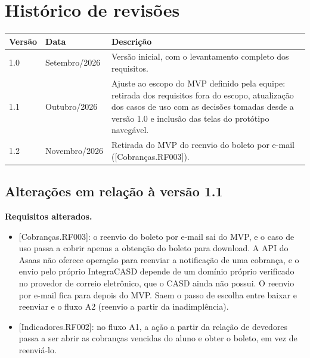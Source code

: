\documentclass[11pt,a4paper,oneside]{report}
\begin{document}

\chapter*{Histórico de revisões}

\begin{tabularx}{\linewidth}{@{}l l X@{}}
  \toprule
  \textbf{Versão} & \textbf{Data} & \textbf{Descrição} \\
  \midrule
  1.0 & Setembro/2026 & Versão inicial, com o levantamento completo dos requisitos. \\
  1.1 & Outubro/2026  & Ajuste ao escopo do MVP definido pela equipe: retirada dos requisitos
                        fora do escopo, atualização dos casos de uso com as decisões tomadas desde
                        a versão 1.0 e inclusão das telas do protótipo navegável. \\
  1.2 & Novembro/2026 & Retirada do MVP do reenvio do boleto por e-mail ([Cobranças.RF003]). \\
  \bottomrule
\end{tabularx}

\section*{Alterações em relação à versão 1.1}

\textbf{Requisitos alterados.}
\begin{itemize}
  \item {[Cobranças.RF003]}: o reenvio do boleto por e-mail sai do MVP, e o caso de uso passa a
        cobrir apenas a obtenção do boleto para download. A API do Asaas não oferece operação para
        reenviar a notificação de uma cobrança, e o envio pelo próprio IntegraCASD depende de um
        domínio próprio verificado no provedor de correio eletrônico, que o CASD ainda não possui.
        O reenvio por e-mail fica para depois do MVP. Saem o passo de escolha entre baixar e
        reenviar e o fluxo A2 (reenvio a partir da inadimplência).
  \item {[Indicadores.RF002]}: no fluxo A1, a ação a partir da relação de devedores passa a ser
        abrir as cobranças vencidas do aluno e obter o boleto, em vez de reenviá-lo.
\end{itemize}
\end{document}
